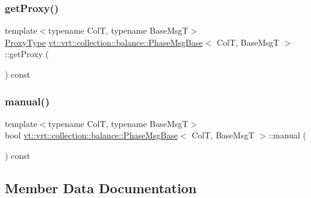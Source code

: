 \subsubsection{\texorpdfstring{get\+Proxy()}{getProxy()}}
{\footnotesize\ttfamily template$<$typename ColT, typename Base\+MsgT$>$ \\
\hyperlink{structvt_1_1vrt_1_1collection_1_1balance_1_1_phase_msg_base_a21c9d10c5a8d1386f4e0a1bfa04f482f}{Proxy\+Type} \hyperlink{structvt_1_1vrt_1_1collection_1_1balance_1_1_phase_msg_base}{vt\+::vrt\+::collection\+::balance\+::\+Phase\+Msg\+Base}$<$ ColT, Base\+MsgT $>$\+::get\+Proxy (\begin{DoxyParamCaption}{ }\end{DoxyParamCaption}) const\hspace{0.3cm}{\ttfamily [inline]}}

\mbox{\label{structvt_1_1vrt_1_1collection_1_1balance_1_1_phase_msg_base_a972351dacbddafb7d6a5d73d57eda63a}} 
\subsubsection{\texorpdfstring{manual()}{manual()}}
{\footnotesize\ttfamily template$<$typename ColT, typename Base\+MsgT$>$ \\
bool \hyperlink{structvt_1_1vrt_1_1collection_1_1balance_1_1_phase_msg_base}{vt\+::vrt\+::collection\+::balance\+::\+Phase\+Msg\+Base}$<$ ColT, Base\+MsgT $>$\+::manual (\begin{DoxyParamCaption}{ }\end{DoxyParamCaption}) const\hspace{0.3cm}{\ttfamily [inline]}}



\subsection{Member Data Documentation}
\mbox{\label{structvt_1_1vrt_1_1collection_1_1balance_1_1_phase_msg_base_a2bc74244216c471b6654b85f35c12456}} 
